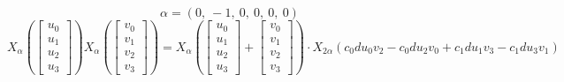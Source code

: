 \documentclass[11pt]{article}
\theoremstyle{definition}
\begin{document}
\[
\alpha = \left( 0, \  -1, \  0, \  0, \  0, \  0\right)
\]
\[
X_{\alpha}\left(\left[\begin{matrix}u_{0}\\u_{1}\\u_{2}\\u_{3}\end{matrix}\right]\right) X_{\alpha}\left(\left[\begin{matrix}v_{0}\\v_{1}\\v_{2}\\v_{3}\end{matrix}\right]\right) = X_{\alpha}\left(\left[\begin{matrix}u_{0}\\u_{1}\\u_{2}\\u_{3}\end{matrix}\right] + \left[\begin{matrix}v_{0}\\v_{1}\\v_{2}\\v_{3}\end{matrix}\right]\right) \cdot X_{2\alpha}\left(c_{0} d u_{0} v_{2} - c_{0} d u_{2} v_{0} + c_{1} d u_{1} v_{3} - c_{1} d u_{3} v_{1}\right)
\]
\end{document}
